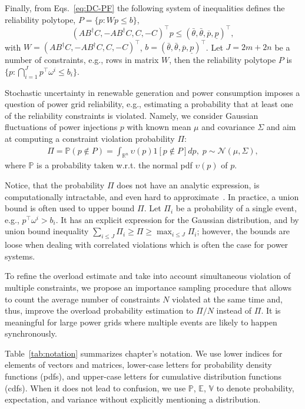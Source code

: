 Finally, from Eqs.~\eqref{eq:DC-PF} the following system of inequalities defines the reliability polytope, $P = \{p: Wp \le b\}$,
\begin{equation}
(AB^\dagger C, - A B^\dagger C, C, -C)^\top p \le (\bar\theta, \bar\theta, \overline{p}, \underline{p})^\top, 
\label{eq:feasibility_ineqs}
\end{equation}
with $W = (AB^\dagger C, - A B^\dagger C, C, -C)^\top$, $b = (\bar\theta, \bar\theta, \overline{p}, \underline{p})^\top$\!\!\!. Let $J = 2m + 2n$ be a number of constraints, e.g., rows in matrix $W$, then the reliability polytope $P$ is $\bigl\{p\!:\! \bigcap_{i=1}^J p^\top\!\!\omega^i \le b_i\bigr\}$. 

Stochastic uncertainty in renewable generation and power consumption imposes a question of power grid reliability, e.g., estimating a probability that at least one of the reliability constraints is violated. Namely, we consider Gaussian fluctuations of power injections $p$ with known mean $\mu$ and covariance $\Sigma$ and aim at computing a constraint violation probability $\Pi$:
\begin{align}\label{eq:prob}
    \Pi = \mathbb{P}(p\not\in P) = \int_{\mathbb{R}^n} \upsilon(p) 1[p\not\in P] d p, \; p\sim \mathcal{N}(\mu, \Sigma), 
\end{align}
where $\mathbb{P}$ is a probability taken w.r.t. the normal pdf $\upsilon(p)$ of $p$. 

Notice, that the probability $\Pi$ does not have an analytic expression, is computationally intractable, and even hard to approximate~\cite{owen2019importance,ryu2014adaptive,cappe2008adaptive, khachiyan1989problem}. 
In practice, a union bound is often used to upper bound $\Pi$. Let $\Pi_i$ be a probability of a single event, e.g., $p^\top\omega^i > b_i$. It has an explicit expression for the Gaussian distribution, and by union bound inequality
$\sum_{i\le J}\Pi_i \ge \Pi \ge \max_{i\le J} \Pi_i$; however, the bounds are loose when dealing with correlated violations which is often the case for power systems. 

To refine the overload estimate and take into account simultaneous violation of multiple constraints, we propose an importance sampling procedure that allows to count the average number of constraints $N$ violated at the same time and, thus, improve the overload probability estimation to $\Pi/N$ instead of $\Pi$. It is meaningful for large power grids where multiple events are likely to happen synchronously.

Table~\ref{tab:notation} summarizes chapter's notation. We use lower indices for elements of vectors and matrices, lower-case letters for probability density functions (pdfs), and upper-case letters for cumulative distribution functions (cdfs). When it does not lead to confusion, we use $\mathbb{P}$, $\mathbb{E}$, $\mathbb{V}$ to denote  probability, expectation, and variance without explicitly mentioning a distribution. 

